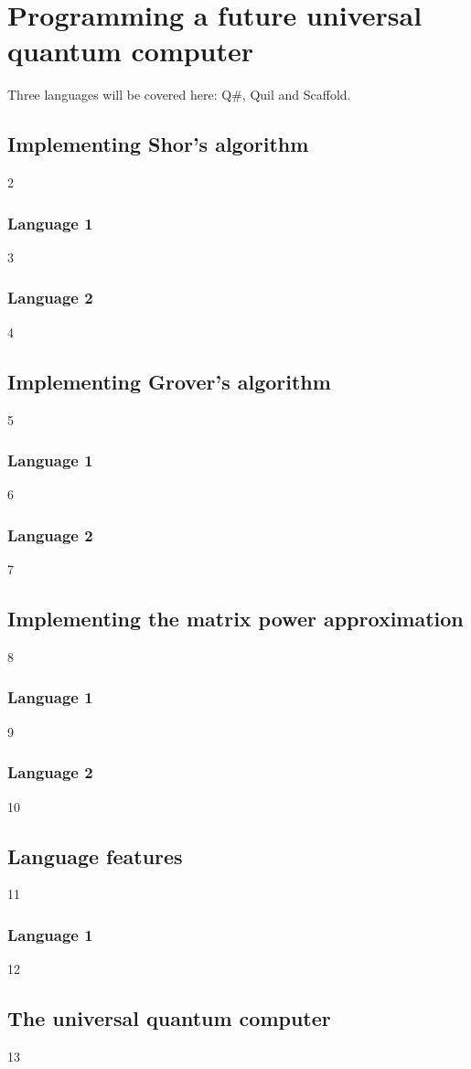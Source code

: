 \section{Programming a future universal quantum computer}\label{Programming a future universal quantum computer}
Three languages will be covered here: Q\#, Quil and Scaffold.
\subsection{Implementing Shor's algorithm}
2
\subsubsection{Language 1}
3
\subsubsection{Language 2}
4
\subsection{Implementing Grover's algorithm}
5
\subsubsection{Language 1}
6
\subsubsection{Language 2}
7
\subsection{Implementing the matrix power approximation}
8
\subsubsection{Language 1}
9
\subsubsection{Language 2}
10
\subsection{Language features}
11
\subsubsection{Language 1}
12
\subsection{The universal quantum computer}
13
